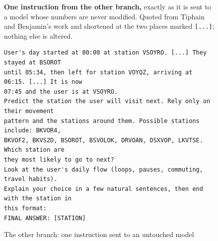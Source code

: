 \begin{figure}[H]
\centering

{\textbf{One instruction from the other branch,} exactly as it is sent to a
model whose numbers are never modified. Quoted from Tiphain and Benjamin's work
and shortened at the two places marked \texttt{[...]}; nothing else is
altered.\par}
\vspace{3pt}

\begin{lstlisting}
User's day started at 00:00 at station VSOYRO. [...] They stayed at BSOROT
until 05:34, then left for station VOYQZ, arriving at 06:15. [...] It is now
07:45 and the user is at VSOYRO.
Predict the station the user will visit next. Rely only on their movement
pattern and the stations around them. Possible stations include: BKVOR4,
BKVOF2, BKVS2D, BSOROT, BSVOLOK, DRVOAN, DSXVOP, LKVTSE. Which station are
they most likely to go to next?
Look at the user's daily flow (loops, pauses, commuting, travel habits).
Explain your choice in a few natural sentences, then end with the station in
this format:
FINAL ANSWER: [STATION]
\end{lstlisting}

\caption{The other branch: one instruction sent to an untouched model}
\label{fig:prompting}

\end{figure}
